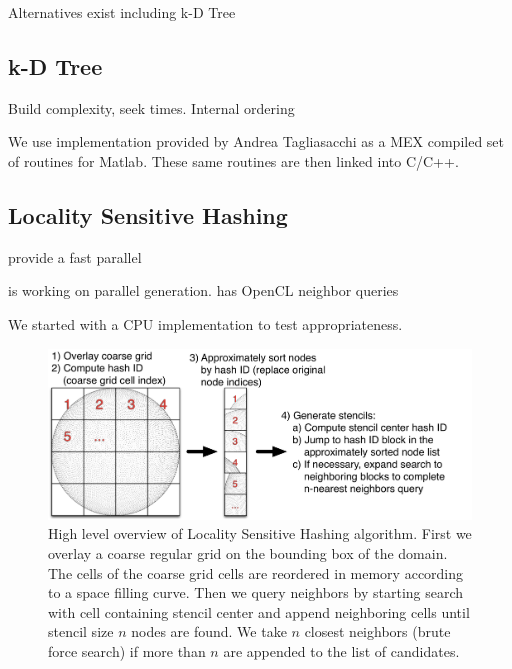 \documentclass{report}
\begin{document}
Alternatives exist including k-D Tree

\subsection{k-D Tree}
Build complexity, seek times. Internal ordering 

We use implementation provided by Andrea Tagliasacchi \cite{tagliasacchi} as a MEX compiled set of routines for Matlab. These same routines are then linked into C/C++. 

\subsection{Locality Sensitive Hashing}

\cite{Connor2009} provide a fast parallel 

\cite{Henke2012} is working on parallel generation. \cite{IanJohnsonThesis} has OpenCL neighbor queries

We started with a CPU implementation to test appropriateness. 


\begin{figure}
\centering
\includegraphics[width=1.0\textwidth]{../figures/chapter2/hashing_example/LSH_Concept.png}
\caption{High level overview of Locality Sensitive Hashing algorithm. First we overlay a coarse regular grid on the bounding box of the domain. The cells of the coarse grid cells are reordered in memory according to a space filling curve. Then we query neighbors by starting search with  cell containing stencil center and append neighboring cells until stencil size $n$ nodes are found. We take $n$ closest neighbors (brute force search) if more than $n$ are appended to the list of candidates. }
\end{figure} 
\end{document}
